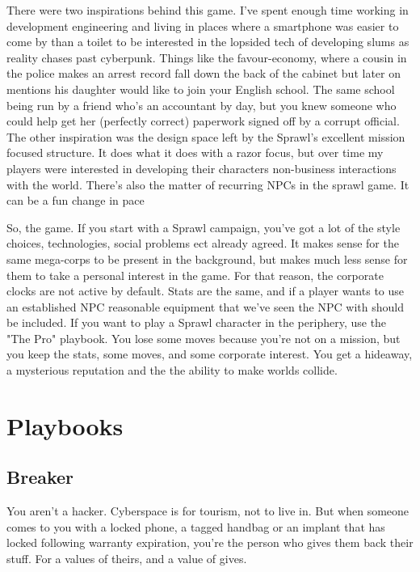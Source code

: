\documentclass{tufte-book}
\begin{document}
There were two inspirations behind this game. I've spent enough time working in development engineering and living in places where a smartphone was easier to come by than a toilet to be interested in the lopsided tech of developing slums as reality chases past cyberpunk. Things like the favour-economy, where a cousin in the police makes an arrest record fall down the back of the cabinet but later on mentions his daughter would like to join your English school.  The same school being run by a friend who's an accountant by day, but you knew someone who could help get her (perfectly correct) paperwork signed off by a corrupt official. The other inspiration was the design space left by the Sprawl's excellent mission focused structure. It does what it does with a razor focus, but over time my players were interested in developing their characters non-business interactions with the world. There's also the matter of recurring NPCs in the sprawl game. It can be a fun change in pace 

So, the game. If you start with a Sprawl campaign, you've got a lot of the style choices, technologies, social problems ect already agreed. It makes sense for the same mega-corps to be present in the background, but makes much less sense for them to take a personal interest in the game. For that reason, the corporate clocks are not active by default. Stats are the same, and if a player wants to use an established NPC reasonable equipment that we've seen the NPC with should be included. If you want to play a Sprawl character in the periphery, use the "The Pro" playbook. You lose some moves because you're not on a mission, but you keep the stats, some moves, and some corporate interest. You get a hideaway, a mysterious reputation and the the ability to make worlds collide.

\chapter{Playbooks} \label{ch:playbooks}

\section{Breaker} \label{sec: Breaker}

You aren't a hacker. Cyberspace is for tourism, not to live in. But when someone comes to you with a locked phone, a tagged handbag or an implant that has locked following warranty expiration, you're the person who gives them back their stuff. For a values of theirs, and a value of gives. 
\end{document}
